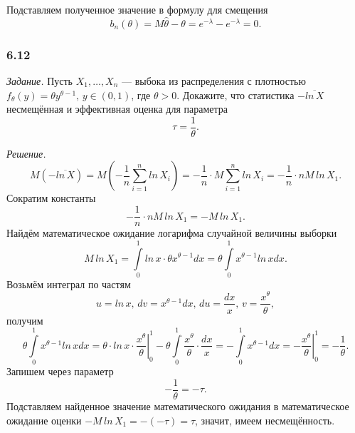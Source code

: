 Подставляем полученное значение в формулу для смещения
$$b_n \left( \theta \right) =
  M \hat{ \theta } - \theta =
  e^{- \lambda } - e^{- \lambda } =
  0.$$

\subsubsection*{6.12}

\textit{Задание.}
Пусть $X_1, \dotsc, X_n$ ---
выбока из распределения с плотностью
$f_{ \theta } \left( y \right) = \theta y^{ \theta - 1}, \,
  y \in \left( 0, 1 \right) $,
где $ \theta > 0$.
Докажите, что статистика $- \overline{ln \, X}$ несмещённая и эффективная оценка для параметра
$$ \tau =
  \frac{1}{ \theta }.$$

\textit{Решение.}
$$M \left( - \overline{ln \, X} \right) =
  M \left( - \frac{1}{n} \sum \limits_{i = 1}^n ln \, X_i \right) =
  - \frac{1}{n} \cdot M \sum \limits_{i = 1}^n ln \, X_i =
  - \frac{1}{n} \cdot nM \, ln \, X_1.$$
Сократим константы
$$- \frac{1}{n} \cdot nM \, ln \, X_1 =
  -M \, ln \, X_1.$$
Найдём математическое ожидание логарифма случайной величины выборки
$$M \, ln \, X_1 =
  \int \limits_0^1 ln \, x \cdot \theta x^{ \theta - 1} dx =
  \theta \int \limits_0^1 x^{ \theta - 1} ln \, x dx.$$
Возьмём интеграл по частям
$$u = ln \, x, \,
  dv = x^{ \theta - 1} dx, \,
  du = \frac{dx}{x}, \,
  v = \frac{x^{ \theta }}{ \theta },$$
получим
$$ \theta \int \limits_0^1 x^{ \theta - 1} ln \, x dx =
  \theta \cdot \left. ln \, x \cdot \frac{x^{ \theta }}{ \theta } \right|_0^1 -
  \theta \int \limits_0^1 \frac{x^{ \theta }}{ \theta } \cdot \frac{dx}{x} =
  - \int \limits_0^1 x^{ \theta - 1} dx =
  - \left. \frac{x^{ \theta }}{ \theta } \right|_0^1 =
  - \frac{1}{ \theta }.$$
Запишем через параметр
$$- \frac{1}{ \theta } =
  - \tau.$$
Подставляем найденное значение математического ожидания в математическое ожидание оценки
$-M \, ln \, X_1 =
  - \left( - \tau \right) =
  \tau $,
значит, имеем несмещённость.

